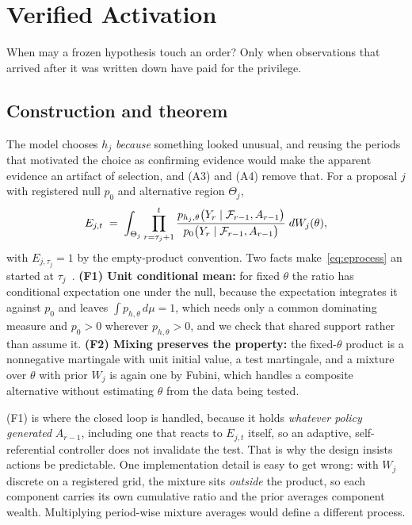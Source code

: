 \section{Verified Activation}
\label{sec:verify}

When may a frozen hypothesis touch an order? Only when observations that arrived
after it was written down have paid for the privilege.

\subsection{Construction and theorem}

The model chooses $h_j$ \emph{because} something looked unusual, and reusing the
periods that motivated the choice as confirming evidence would make the apparent
evidence an artifact of selection, and (A3) and (A4) remove that. For a
proposal $j$ with registered null $p_0$ and alternative region $\Theta_j$,
\begin{equation}
E_{j,t} \;=\; \int_{\Theta_j}
\prod_{r=\tau_j+1}^{t}
\frac{p_{h_j,\theta}\bigl(Y_r \mid \mathcal{F}_{r-1}, A_{r-1}\bigr)}
     {p_0\bigl(Y_r \mid \mathcal{F}_{r-1}, A_{r-1}\bigr)}
\; dW_j(\theta),
\label{eq:eprocess}
\end{equation}
with $E_{j,\tau_j} = 1$ by the empty-product convention. Two facts
make~\eqref{eq:eprocess} an \eprocess{} started at $\tau_j$~\cite{ramdas-savi,
e-detectors}. \textbf{(F1) Unit conditional mean:} for fixed $\theta$ the ratio has conditional
expectation one under the null, because the expectation integrates it against
$p_0$ and leaves $\int p_{h,\theta}\, d\mu = 1$, which needs only a common
dominating measure and $p_0 > 0$ wherever $p_{h,\theta} > 0$, and we check that
shared support rather than assume it. \textbf{(F2) Mixing preserves the property:} the
fixed-$\theta$ product is a nonnegative martingale with unit initial value, a
test martingale, and a mixture over $\theta$ with prior $W_j$ is again one by
Fubini, which handles a composite alternative without estimating $\theta$ from
the data being tested.

(F1) is where the closed loop is handled, because it holds \emph{whatever policy
generated} $A_{r-1}$, including one that reacts to $E_{j,t}$ itself, so an
adaptive, self-referential controller does not invalidate the test. That is why
the design insists actions be predictable. One implementation detail is easy to
get wrong: with $W_j$ discrete on a registered grid, the mixture sits
\emph{outside} the product, so each component carries its own cumulative ratio
and the prior averages component wealth. Multiplying period-wise mixture averages
would define a different process.

